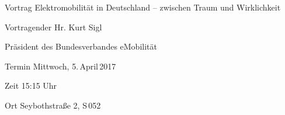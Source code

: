 \documentclass[department=FakIM,parskip=half]{OTHR_Placard}
\begin{document}
\begin{placard}

\begin{psection}{Vortrag}
\huge Elektromobilität in Deutschland -- zwischen Traum und Wirklichkeit
\end{psection}

\begin{psection}{Vortragender}
{\huge Hr. Kurt Sigl}

Präsident des Bundesverbandes eMobilität
\end{psection}

\begin{psection}{Termin}
\huge Mittwoch, 5.\,April\,2017
\end{psection}

\begin{psection}{Zeit}
\LARGE 15:15 Uhr
\end{psection}

\begin{psection}{Ort}
\LARGE Seybothstraße 2, S\,052
\end{psection}


%
%  
%

\end{placard}
\end{document}
